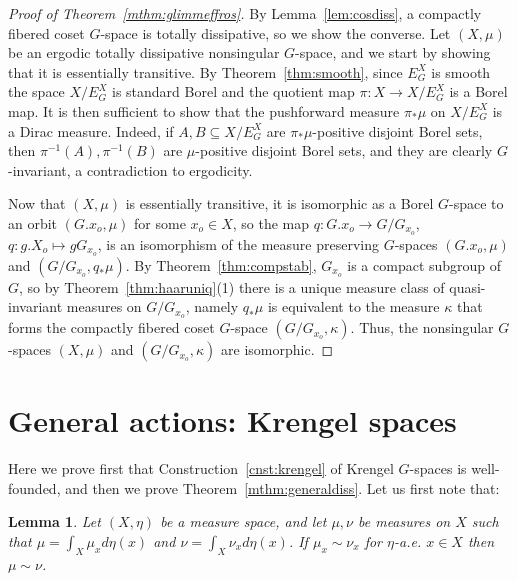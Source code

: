 \documentclass{amsart}
\numberwithin{equation}{subsection}
\newtheorem{lem}[thm]{Lemma}
\begin{document}
\begin{proof}[Proof of Theorem~\ref{mthm:glimmeffros}]
By Lemma~\ref{lem:cosdiss}, a compactly fibered coset \(G\)-space is totally dissipative, so we show the converse. Let \(\left(X,\mu\right)\) be an ergodic totally dissipative nonsingular \(G\)-space, and we start by showing that it is essentially transitive. By Theorem~\ref{thm:smooth}, since \(E_{G}^{X}\) is smooth the space \(X/E_{G}^{X}\) is standard Borel and the quotient map \(\pi:X\rightarrow X/E_{G}^{X}\) is a Borel map. It is then sufficient to show that the pushforward measure \(\pi_{\ast}\mu\) on \(X/E_{G}^{X}\) is a Dirac measure. Indeed, if \(A,B\subseteq X/E_{G}^{X}\) are \(\pi_{\ast}\mu\)-positive disjoint Borel sets, then \(\pi^{-1}\left(A\right),\pi^{-1}\left(B\right)\) are \(\mu\)-positive disjoint Borel sets, and they are clearly \(G\)-invariant, a contradiction to ergodicity.

Now that \(\left(X,\mu\right)\) is essentially transitive, it is isomorphic as a Borel \(G\)-space to an orbit \(\left(G.x_{o},\mu\right)\) for some \(x_{o}\in X\), so the map \(q:G.x_{o}\to G/G_{x_{o}}\), \(q:g.X_{o}\mapsto gG_{x_{o}}\), is an isomorphism of the measure preserving \(G\)-spaces \(\left(G.x_{o},\mu\right)\) and \(\left(G/G_{x_{o}},q_{\ast}\mu\right)\). By Theorem~\ref{thm:compstab}, \(G_{x_{o}}\) is a compact subgroup of \(G\), so by Theorem~\ref{thm:haaruniq}(1) there is a unique measure class of quasi-invariant measures on \(G/G_{x_{o}}\), namely \(q_{\ast}\mu\) is equivalent to the measure \(\kappa\) that forms the compactly fibered coset \(G\)-space \(\left(G/G_{x_{o}},\kappa\right)\). Thus, the nonsingular \(G\)-spaces \(\left(X,\mu\right)\) and \(\left(G/G_{x_{o}},\kappa\right)\) are isomorphic.
\end{proof}

\section{General actions: Krengel spaces}

Here we prove first that Construction~\ref{cnst:krengel} of Krengel \(G\)-spaces is well-founded, and then we prove Theorem~\ref{mthm:generaldiss}. Let us first note that:

\begin{lem}
\label{lem:fibequiv}
Let \(\left(X,\eta\right)\) be a measure space, and let \(\mu,\nu\) be measures on \(X\) such that \(\mu=\int_{X}\mu_{x}d\eta\left(x\right)\) and \(\nu=\int_{X}\nu_{x}d\eta\left(x\right)\). If \(\mu_{x}\sim\nu_{x}\) for \(\eta\)-a.e. \(x\in X\) then \(\mu\sim\nu\).
\end{lem}
\end{document}

